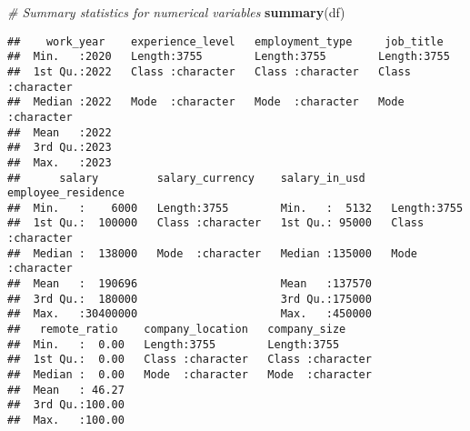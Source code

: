 \documentclass[
]{article}
\newenvironment{Shaded}{\begin{snugshade}}{\end{snugshade}}
\newcommand{\CommentTok}[1]{\textcolor[rgb]{0.56,0.35,0.01}{\textit{#1}}}
\newcommand{\FunctionTok}[1]{\textcolor[rgb]{0.13,0.29,0.53}{\textbf{#1}}}
\newcommand{\NormalTok}[1]{#1}
\begin{document}
\begin{Shaded}
\begin{Highlighting}[]
\CommentTok{\# Summary statistics for numerical variables}
\FunctionTok{summary}\NormalTok{(df)}
\end{Highlighting}
\end{Shaded}

\begin{verbatim}
##    work_year    experience_level   employment_type     job_title        
##  Min.   :2020   Length:3755        Length:3755        Length:3755       
##  1st Qu.:2022   Class :character   Class :character   Class :character  
##  Median :2022   Mode  :character   Mode  :character   Mode  :character  
##  Mean   :2022                                                           
##  3rd Qu.:2023                                                           
##  Max.   :2023                                                           
##      salary         salary_currency    salary_in_usd    employee_residence
##  Min.   :    6000   Length:3755        Min.   :  5132   Length:3755       
##  1st Qu.:  100000   Class :character   1st Qu.: 95000   Class :character  
##  Median :  138000   Mode  :character   Median :135000   Mode  :character  
##  Mean   :  190696                      Mean   :137570                     
##  3rd Qu.:  180000                      3rd Qu.:175000                     
##  Max.   :30400000                      Max.   :450000                     
##   remote_ratio    company_location   company_size      
##  Min.   :  0.00   Length:3755        Length:3755       
##  1st Qu.:  0.00   Class :character   Class :character  
##  Median :  0.00   Mode  :character   Mode  :character  
##  Mean   : 46.27                                        
##  3rd Qu.:100.00                                        
##  Max.   :100.00
\end{verbatim}
\end{document}
